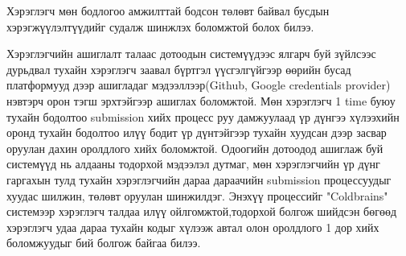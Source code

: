 Хэрэглэгч мөн бодлогоо амжилттай бодсон төлөвт байвал бусдын хэрэгжүүлэлтүүдийг судалж шинжлэх боломжтой болох билээ.

Хэрэглэгчийн ашиглалт талаас дотоодын системүүдээс ялгарч буй зүйлсээс дурьдвал тухайн хэрэглэгч заавал бүртгэл үүсгэлгүйгээр өөрийн бусад платформууд дээр ашигладаг мэдээллээр(Github, Google credentials provider\footnotemark{}) нэвтэрч орон тэгш эрхтэйгээр ашиглах боломжтой. Мөн хэрэглэгч 1 time буюу тухайн бодолтоо submission хийх процесс руу дамжуулаад үр дүнгээ хүлээхийн оронд тухайн бодолтоо илүү бодит үр дүнтэйгээр тухайн хуудсан дээр засвар оруулан дахин оролдлого хийх боломжтой. Одоогийн дотоодод ашиглаж буй системүүд нь алдааны тодорхой мэдээлэл дутмаг, мөн хэрэглэгчийн үр дүнг гаргахын тулд тухайн хэрэглэгчийн дараа дараачийн submission процессуудыг хуудас шилжин, төлөвт оруулан шинжилдэг. Энэхүү процессийг "Coldbrains" системээр хэрэглэгч талдаа илүү ойлгомжтой,тодорхой болгож шийдсэн бөгөөд хэрэглэгч удаа дараа тухайн кодыг хүлээж автал олон оролдлого 1 дор хийх боломжуудыг бий болгож байгаа билээ.
